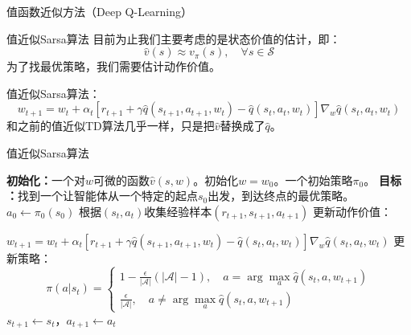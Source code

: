 \begin{section}{值函数近似方法\alert{（Deep Q-Learning）}}
\begin{frame}{值近似Sarsa算法}
    目前为止我们主要考虑的是状态价值的估计，即：
    \[
        \hat{v}(s)\approx v_\pi(s),\quad \forall s\in \mathcal{S}
    \]
    为了找最优策略，我们需要估计动作价值。

    值近似Sarsa算法：
    \alert{\[
        w_{t+1}=w_t+\alpha_t[r_{t+1}+\gamma \hat{q}(s_{t+1},a_{t+1},w_t)-\hat{q}(s_t,a_t,w_t)]\nabla_w\hat{q}(s_t,a_t,w_t)
    \]}
    和之前的值近似TD算法几乎一样，只是把$\hat{v}$替换成了$\hat{q}$。
\end{frame}

\begin{frame}{值近似Sarsa算法}
    \begin{algorithmic}[1]
        \State \textbf{初始化：}一个对$w$可微的函数$\hat{v}(s,w)$。初始化$w=w_0$。一个初始策略$\pi_0$。
        \State \textbf{目标 ：}找到一个让智能体从一个特定的起点$s_0$出发，到达终点的最优策略。
            \State $a_0\leftarrow\pi_0(s_0)$
                \State 根据$(s_t,a_t)$收集经验样本$(r_{t+1}, s_{t+1},a_{t+1})$
                \State 更新动作价值：

                $w_{t+1}=w_t+\alpha_t[r_{t+1}+\gamma \hat{q}(s_{t+1},a_{t+1},w_t)-\hat{q}(s_t,a_t,w_t)]\nabla_w\hat{q}(s_t,a_t,w_t)$
                \State 更新策略：
                \[
                    \pi(a|s_t)=\begin{cases}
                        1-\frac{\epsilon}{|\mathcal{A}|}(|\mathcal{A}|-1),\quad a=\arg\max_{a}\hat{q}(s_t,a,w_{t+1}) \\
                        \frac{\epsilon}{|\mathcal{A}|},\quad a \neq \arg\max_{a}\hat{q}(s_t,a,w_{t+1})
                    \end{cases}
                \]
                \State $s_{t+1}\leftarrow s_t$，$a_{t+1}\leftarrow a_t$
            \EndWhile
        \EndFor
    \end{algorithmic}
\end{frame}


\end{section}
